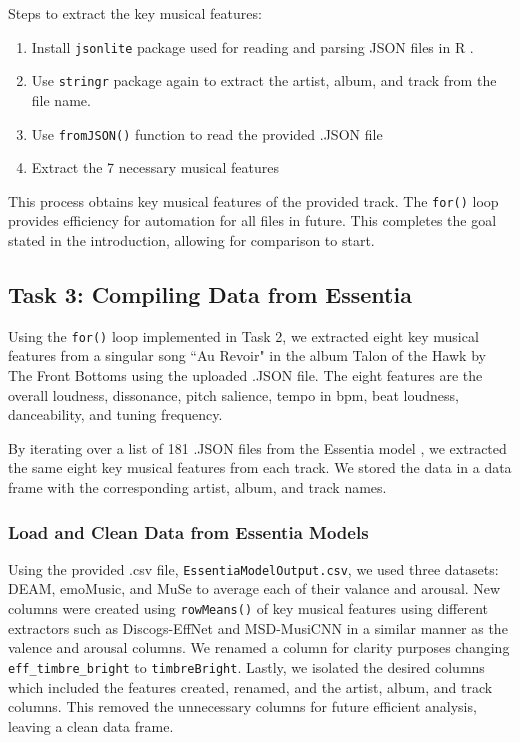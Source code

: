 \documentclass{article}\usepackage[]{graphicx}\usepackage[]{xcolor}
\begin{document}
\begin{multicols}{2}
Steps to extract the key musical features:

\begin{enumerate}
  \item Install \texttt{jsonlite} package used for reading and parsing JSON files in R \citep{Ooms}.
  \item Use \texttt{stringr} package again to extract the artist, album, and track from the file name.
  \item Use \texttt{fromJSON()} function to read the provided .JSON file 
  \item Extract the 7 necessary musical features
\end{enumerate}

This process obtains key musical features of the provided track. The \texttt{for()} loop provides efficiency for automation for all files in future. This completes the goal stated in the introduction, allowing for comparison to start.

\subsection{Task 3: Compiling Data from Essentia}

Using the \texttt{for()} loop implemented in Task 2, we extracted eight key musical features from a singular song ``Au Revoir" in the album Talon of the Hawk by The Front Bottoms using the uploaded .JSON file. The eight features are the overall loudness, dissonance, pitch salience, tempo in bpm, beat loudness, danceability, and tuning frequency.

By iterating over a list of 181 .JSON files from the Essentia model \citep{Bogdanov}, we extracted the same eight key musical features from each track. We stored the data in a data frame with the corresponding artist, album, and track names. 

\subsubsection{Load and Clean Data from Essentia Models}

Using the provided .csv file, \texttt{EssentiaModelOutput.csv}, we used three datasets: DEAM, emoMusic, and MuSe to average each of their valance and arousal. New columns were created using \texttt{rowMeans()} of key musical features using different extractors such as Discogs-EffNet and MSD-MusiCNN in a similar manner as the valence and arousal columns. We renamed a column for clarity purposes changing \texttt{eff\_timbre\_bright} to \texttt{timbreBright}. Lastly, we isolated the desired columns which included the features created, renamed, and the artist, album, and track columns. This removed the unnecessary columns for future efficient analysis, leaving a clean data frame. 


\end{multicols}
\end{document}
